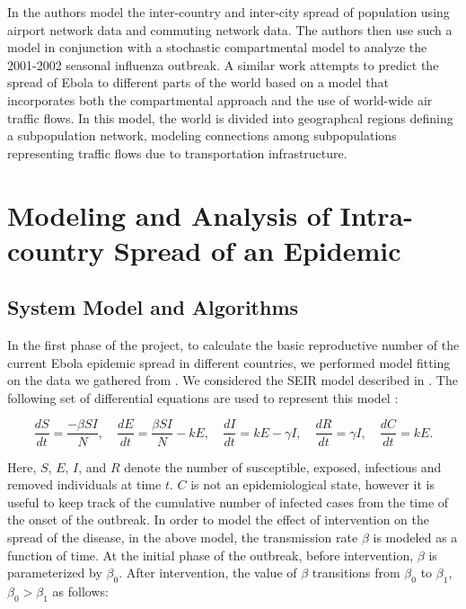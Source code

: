 \documentclass[10pt, journal,onecolumn]{IEEEtran}
\begin{document}
In \citep{balcan2010modeling} the authors model the inter-country and inter-city spread of
population using airport network data and commuting network data. The authors then use such a model in
conjunction with a stochastic compartmental model to analyze the 2001-2002 seasonal influenza
outbreak. A similar work \citep{gomes2014assessing} attempts to predict the spread of Ebola to
different parts of the world based on a model that incorporates both the compartmental approach and
the use of world-wide air traffic flows. In this model, the world is divided into geographcal
regions defining a subpopulation network, modeling connections among subpopulations representing
traffic flows due to transportation infrastructure.



\section{{Modeling and Analysis of Intra-country Spread of an Epidemic}}
\label{sec:IntraCountry}

\subsection{System Model and Algorithms}
In the first phase of the project, to calculate the basic reproductive number of the current Ebola
epidemic spread in different countries, we performed model fitting on the data we gathered from
\citep{cmriversdata}. We considered the SEIR model described in \citep{chowell2004basic}. The
following set of differential equations are used to represent this model \citep{chowell2004basic}:

\begin{equation}
\dfrac{dS}{dt}	=	\dfrac{-\beta SI}{N},
\quad
\dfrac{dE}{dt}	=	\dfrac{\beta SI}{N}-kE,
\quad
\dfrac{dI}{dt}	=	kE-\gamma I,
\quad
\dfrac{dR}{dt}	=	\gamma I,
\quad
\dfrac{dC}{dt}	=	kE.
\label{Eq:SEIR}
\end{equation}

Here, $S$, $E$, $I$, and $R$ denote the number of susceptible, exposed, infectious and removed
individuals at time $t$. $C$ is not an epidemiological state, however it is useful to keep track of
the cumulative number of infected cases from the time of the onset of the outbreak. In order to
model the effect of intervention on the spread of the disease, in the above model, the transmission
rate $\beta$ is modeled as a function of time. At the initial phase of the outbreak, before
intervention, $\beta$ is parameterized by $\beta_0$. After intervention, the value of $\beta$
transitions from $\beta_0$ to $\beta_1$, $\beta_0>\beta_1$ as follows:
\end{document}
